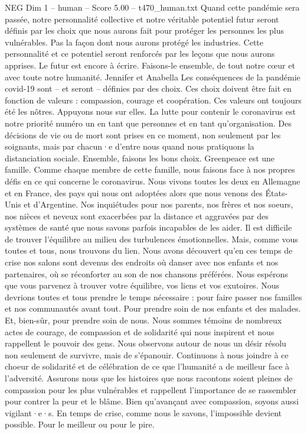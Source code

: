 \begin{textsample}{NEG Dim 1 – human – Score 5.00 – t470\_human.txt}
Quand cette pandémie sera passée, notre personnalité collective et notre véritable potentiel futur seront définis par les choix que nous aurons fait pour protéger les personnes les plus vulnérables.
Pas la façon dont nous aurons protégé les industries.
Cette personnalité et ce potentiel seront renforcés par les leçons que nous aurons apprises.
Le futur est encore à écrire.
Faisons-le ensemble, de tout notre cœur et avec toute notre humanité.
Jennifer et Anabella Les conséquences de la pandémie covid-19 sont – et seront – définies par des choix.
Ces choix doivent être fait en fonction de valeurs : compassion, courage et coopération.
Ces valeurs ont toujours été les nôtres.
Appuyons nous sur elles.
La lutte pour contenir le coronavirus est notre priorité numéro un en tant que personnes et en tant qu’organisation.
Des décisions de vie ou de mort sont prises en ce moment, non seulement par les soignants, mais par chacun·e d’entre nous quand nous pratiquons la distanciation sociale.
Ensemble, faisons les bons choix.
Greenpeace est une famille.
Comme chaque membre de cette famille, nous faisons face à nos propres défis en ce qui concerne le coronavirus.
Nous vivons toutes les deux en Allemagne et en France, des pays qui nous ont adoptées alors que nous venons des États-Unis et d’Argentine.
Nos inquiétudes pour nos parents, nos frères et nos soeurs, nos nièces et neveux sont exacerbées par la distance et aggravées par des systèmes de santé que nous savons parfois incapables de les aider.
Il est difficile de trouver l’équilibre au milieu des turbulences émotionnelles.
Mais, comme vous toutes et tous, nous trouvons du lien.
Nous avons découvert qu’en ces temps de crise nos salons sont devenus des endroits où danser avec nos enfants et nos partenaires, où se réconforter au son de nos chansons préférées.
Nous espérons que vous parvenez à trouver votre équilibre, vos liens et vos exutoires.
Nous devrions toutes et tous prendre le temps nécessaire : pour faire passer nos familles et nos communautés avant tout.
Pour prendre soin de nos enfants et des malades.
Et, bien-sûr, pour prendre soin de nous.
Nous sommes témoins de nombreux actes de courage, de compassion et de solidarité qui nous inspirent et nous rappellent le pouvoir des gens.
Nous observons autour de nous un désir résolu non seulement de survivre, mais de s’épanouir.
Continuons à nous joindre à ce choeur de solidarité et de célébration de ce que l’humanité a de meilleur face à l’adversité.
Assurons nous que les histoires que nous racontons soient pleines de compassion pour les plus vulnérables et rappellent l’importance de se rassembler pour contrer la peur et le blâme.
Bien qu’avançant avec compassion, soyons aussi vigilant·e·s.
En temps de crise, comme nous le savons, l’impossible devient possible.
Pour le meilleur ou pour le pire.

\end{textsample}
